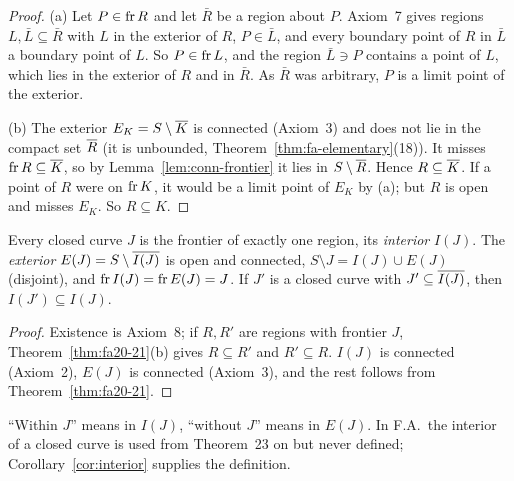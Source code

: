 \begin{proof}
(a) Let $P\in\operatorname{fr} R$ and let $\bar R$ be a region about $P$. Axiom~7 gives regions $L,\bar L\subseteq\bar
R$ with $L$ in the exterior of $R$, $P\in\bar L$, and every boundary point of $R$ in $\bar L$ a boundary
point of $L$. So $P\in\operatorname{fr} L$, and the region $\bar L\ni P$ contains a point of $L$, which lies in the
exterior of $R$ and in $\bar R$. As $\bar R$ was arbitrary, $P$ is a limit point of the exterior.

(b) The exterior $E_K=S\setminus\overline{K}$ is connected (Axiom~3) and does not lie in the compact set $\overline{R}$
(it is unbounded, Theorem~\ref{thm:fa-elementary}(18)). It misses $\operatorname{fr} R\subseteq\overline{K}$, so by
Lemma~\ref{lem:conn-frontier} it lies in $S\setminus\overline{R}$. Hence $R\subseteq\overline{K}$. If a point of $R$ were
on $\operatorname{fr} K$, it would be a limit point of $E_K$ by (a); but $R$ is open and misses $E_K$. So
$R\subseteq K$.
\end{proof}


\begin{corollary}\label{cor:interior}
Every closed curve $J$ is the frontier of exactly one region, its \emph{interior} $I(J)$. The
\emph{exterior} $E(J)=S\setminus\overline{I(J)}$ is open and connected, $S\setminus J=I(J)\cup E(J)$ (disjoint), and
$\operatorname{fr} I(J)=\operatorname{fr} E(J)=J$. If $J'$ is a closed curve with $J'\subseteq\overline{I(J)}$, then $I(J')\subseteq I(J)$.
\end{corollary}

\begin{proof}
Existence is Axiom~8; if $R,R'$ are regions with frontier $J$, Theorem~\ref{thm:fa20-21}(b) gives
$R\subseteq R'$ and $R'\subseteq R$. $I(J)$ is connected (Axiom~2), $E(J)$ is connected (Axiom~3), and the
rest follows from Theorem~\ref{thm:fa20-21}.
\end{proof}


``Within $J$'' means in $I(J)$, ``without $J$'' means in $E(J)$. In F.A.\ the interior of a closed curve
is used from Theorem~23 on but never defined; Corollary~\ref{cor:interior} supplies the definition.

